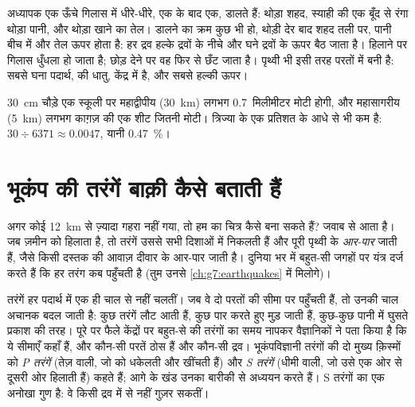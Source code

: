 \begin{inthelab}[गिलास में परतें (कक्षा में, अध्यापक के साथ)]
अध्यापक एक ऊँचे गिलास में धीरे-धीरे, एक के बाद एक, डालते हैं:
थोड़ा शहद, स्याही की एक बूँद से रंगा थोड़ा पानी, और थोड़ा खाने का तेल।
डालने का क्रम कुछ भी हो, थोड़ी देर बाद शहद तली पर, पानी
बीच में और तेल ऊपर होता है: हर द्रव हल्के द्रवों के नीचे और
घने द्रवों के ऊपर बैठ जाता है। हिलाने पर गिलास
धुँधला हो जाता है; छोड़ देने पर वह फिर से छँट जाता है। पृथ्वी भी इसी तरह परतों में बनी है: सबसे घना पदार्थ,  की धातु, केंद्र में है, और सबसे हल्की  ऊपर।
\end{inthelab}


\begin{remark}[भूपर्पटी कितनी पतली है?]\label{rem:g6:inside-the-earth:thin-crust}
30~cm चौड़े एक स्कूली  पर महाद्वीपीय  (30~km) लगभग
0.7~मिलीमीटर मोटी होगी, और महासागरीय  (5~km) लगभग
काग़ज़ की एक शीट जितनी मोटी।  त्रिज्या के एक प्रतिशत के आधे
से भी कम है: $30 \div 6371 \approx 0.0047$, यानी 0.47~\%।
\end{remark}

\section{भूकंप की तरंगें बाक़ी कैसे बताती हैं}\label{sec:g6:inside-the-earth:waves}

अगर कोई 12~km से ज़्यादा गहरा नहीं गया, तो हम  का चित्र कैसे बना सकते हैं? जवाब
 से आता है। जब  ज़मीन को हिलाता है, तो तरंगें उससे सभी दिशाओं में
निकलती हैं और पूरी पृथ्वी के \emph{आर-पार} जाती हैं, जैसे किसी दस्तक की आवाज़ दीवार
के आर-पार जाती है। दुनिया भर में बहुत-सी जगहों पर यंत्र दर्ज करते हैं कि हर तरंग कब पहुँचती है (तुम उनसे
\cref{ch:g7:earthquakes} में मिलोगे)।

तरंगें हर पदार्थ में एक ही चाल से नहीं चलतीं। जब वे दो परतों की सीमा पर पहुँचती
हैं, तो उनकी चाल अचानक बदल जाती है: कुछ तरंगें लौट आती हैं, कुछ पार करते हुए
मुड़ जाती हैं, कुछ-कुछ पानी में घुसते प्रकाश की तरह। पूरे  पर फैले केंद्रों पर बहुत-से  की तरंगों का समय नापकर वैज्ञानिकों ने पता किया है कि ये सीमाएँ कहाँ हैं, और
कौन-सी परतें ठोस हैं और कौन-सी द्रव। भूकंपविज्ञानी तरंगों की दो मुख्य क़िस्मों को
\emph{P तरंगें} (तेज़ वाली, जो  को धकेलती और खींचती हैं) और
\emph{S तरंगें} (धीमी वाली, जो उसे एक ओर से दूसरी ओर हिलाती हैं) कहते हैं; आगे के
खंड उनका बारीकी से अध्ययन करते हैं। S तरंगों का एक अनोखा गुण है: वे
किसी द्रव में से नहीं गुज़र सकतीं।

